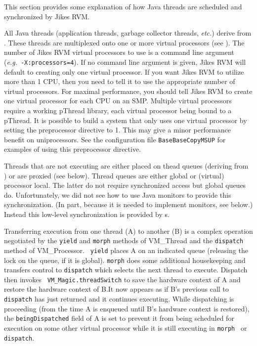 This section provides some explanation of how Java\TMweb{} threads are
scheduled and synchronized by Jikes\TMweb{} RVM.\@


\label{threads:single-virtual-processor}All Java threads (application threads, garbage collector threads, {\em
etc.})  derive from 
.  
These threads are multiplexed onto
one or more virtual processors (see 
).  The 
number of Jikes RVM virtual processors to use is a command line
argument ({\it e.g.}\ {\tt -X:processors=4}).  If no command line
argument is given, Jikes RVM will default to creating only one virtual
processor. If you want Jikes RVM to utilize more than 1 CPU, then you
need to tell it to use the appropriate number of virtual processors.
For maximal performance, you should tell Jikes RVM to create one
virtual processor for each CPU on an SMP.  Multiple virtual processors
require a working pThread library, each virtual processor being bound
to a pThread.  It is possible to build a system that only uses one
virtual processor by setting the preprocessor directive
 to 1.  
This may give a minor
performance benefit on uniprocessors. See the configuration file
{\tt BaseBaseCopyMSUP} for examples of
using this preprocessor directive.

Threads that are not executing are either placed on thead queues
(deriving from 
) or are proxied (see below).
Thread queues are either global or (virtual) processor local.  The
latter do not require synchronized access but global queues do.
Unfortunately, we did not see how to use Java monitors to provide
this synchronization.  (In part, because it is needed to implement
monitors, see below.)  Instead this low-level synchronization is
provided by 
s.

Transferring execution from one thread (A) to another (B) is a complex
operation negotiated by the {\tt yield} and {\tt morph} methods of
VM\_Thread and the {\tt dispatch} method of VM\_Processor.  {\tt
yield} places A on an indicated queue (releasing the lock on the
queue, if it is global).  {\tt morph} does some additional
housekeeping and transfers control to {\tt dispatch} which selects the
next thread to execute. Dispatch then invokes {\tt
VM\_Ma\-gic.thread\-Switch} to save the hardware context of A and restore
the hardware context of B.\@  It now appears as if B's previous call to
{\tt dispatch} has just returned and it continues executing. While
dispatching is proceeding (from the time A is enqueued until B's
hardware context is restored), the {\tt be\-ing\-Dis\-patched} field of A is
set to prevent it from being scheduled for execution on some other
virtual processor while it is still executing in {\tt morph } or {\tt
dispatch}. 

